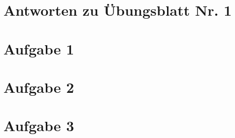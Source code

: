 \documentclass{scrartcl}
\begin{document}
\section*{Antworten zu Übungsblatt Nr. 1}

\section*{Aufgabe 1}
\section*{Aufgabe 2}
\section*{Aufgabe 3}
\end{document}
